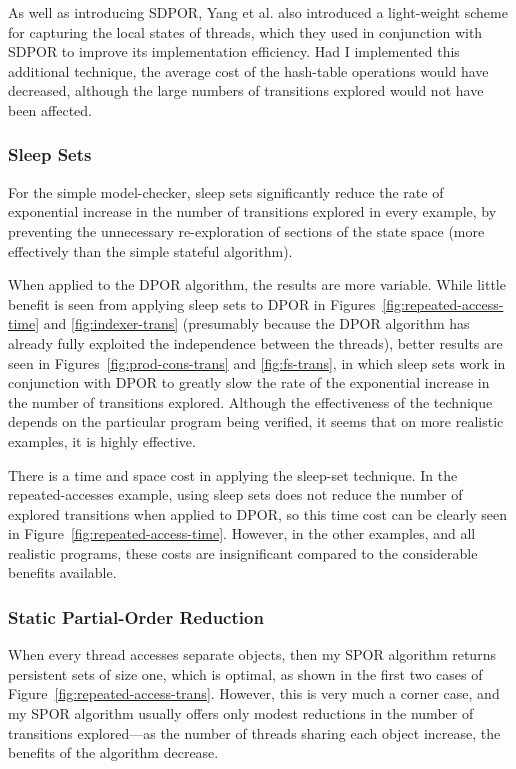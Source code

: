 \documentclass[12pt,a4paper,twoside,openany]{report}
\begin{document}
As well as introducing SDPOR, Yang et al.\@
also introduced a light-weight
scheme for capturing the local states of
threads, which they used in conjunction with
SDPOR to improve its implementation efficiency.
Had I implemented this additional
technique, the average cost of the hash-table
operations would have decreased, although
the large numbers of transitions explored
would not have been affected.

\subsubsection{Sleep Sets}
For the simple model-checker,
sleep sets significantly reduce the
rate of exponential increase in
the number of transitions explored in every example,
by preventing the
unnecessary re-exploration of sections
of the state space (more effectively
than the simple stateful algorithm).

When applied to the DPOR algorithm, the results
are more variable. While little benefit is seen
from applying sleep sets to DPOR in
Figures~\ref{fig:repeated-access-time}
and \ref{fig:indexer-trans}
(presumably because the DPOR algorithm has already
fully exploited the independence between the threads),
better results are seen in 
Figures~\ref{fig:prod-cons-trans} and \ref{fig:fs-trans},
in which sleep sets work
in conjunction with DPOR to greatly
slow the rate of the exponential increase in the
number of transitions explored.
Although the effectiveness of the technique
depends on the particular program being
verified, it seems that on more realistic
examples, it is highly effective.

There is a time and space cost in
applying the sleep-set technique.
In the repeated-accesses example,
using sleep sets does not reduce the number
of explored transitions when applied
to DPOR, so this time cost can be clearly
seen in Figure~\ref{fig:repeated-access-time}.
However, in the other examples, and all
realistic programs, these
costs are insignificant compared
to the considerable benefits available.

\subsubsection{Static Partial-Order Reduction}
When every thread accesses separate objects,
then my SPOR algorithm returns persistent sets
of size one, which is optimal, as shown in the
first two cases of
Figure~\ref{fig:repeated-access-trans}.
However, this is very much a corner case,
and my SPOR algorithm usually offers only
modest reductions in the number of transitions
explored---as the number of threads sharing
each object increase, the benefits of the
algorithm decrease.
\end{document}
